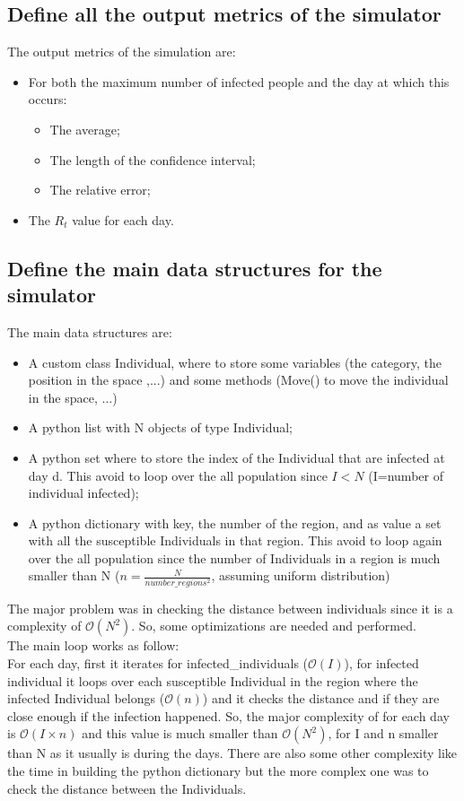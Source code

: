 \documentclass[twocolumn,letterpaper]{report}
\begin{document}
{				\subsection{Define all the output metrics of the simulator}
				The output metrics of the simulation are:
				\begin{itemize}
					\item For both the maximum number of infected people and the day at which this occurs:
					\begin{itemize}
						\item The average;
						\item The length of the confidence interval;
						\item The relative error;
					\end{itemize}
					\item The $R_t$ value for each day.
				\end{itemize}
			
			\subsection{Define the main data structures for the simulator}
						The main data structures are: 
							\begin{itemize}
								\item A custom class Individual, where to store some variables (the category, the position in the space ,...) and some methods (Move() to move the individual in the space, ...)
								\item A python list with N objects of type Individual;
								\item A python set where to store the index of the Individual that are infected at day d. This avoid to loop over the all population since $I<N$ (I=number of individual infected);
								\item A python dictionary with key, the number of the region, and as value a set with all the susceptible Individuals in that region. This avoid to loop again over the all population since the number of Individuals in a region is much smaller than N ($n=\frac{N}{number\_regions^2}$, assuming uniform distribution)
							\end{itemize}
							The major problem was in checking the distance between individuals since it is a complexity of $\mathcal{O}(N^2)$. So, some optimizations are needed and performed. \\ The main loop works as follow: \\ For each day, first it iterates for infected\_individuals ($\mathcal{O}(I)$), for infected individual it loops over each susceptible Individual in the region where the infected Individual belongs ($\mathcal{O}(n)$) and it checks the distance and if they are close enough if the infection happened. So, the major complexity of for each day is $\mathcal{O}(I \times n)$ and this value is much smaller than $\mathcal{O}(N^2)$, for I and n smaller than N as it usually is during the days. There are also some other complexity like the time in building the python dictionary but the more complex one was to check the distance between the Individuals.
					
}
\end{document}
